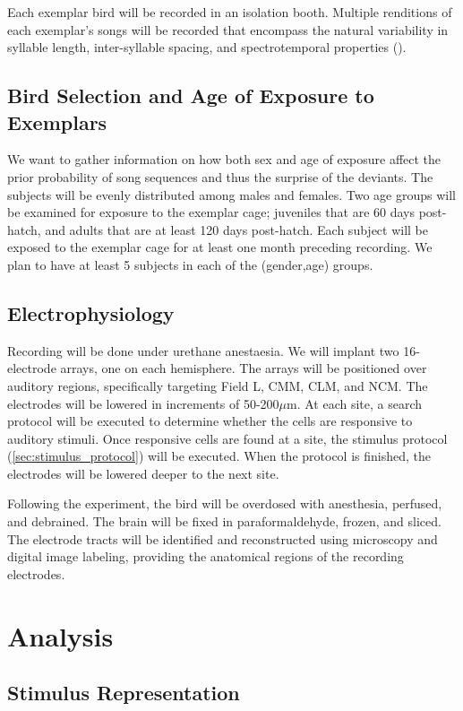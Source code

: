 \documentclass[12pt,article,oneside]{memoir}
\begin{document}
Each exemplar bird will be recorded in an isolation booth. Multiple renditions of each
exemplar's songs will be recorded that encompass the natural variability in syllable
length, inter-syllable spacing, and spectrotemporal properties (\cite{Glaze2006}).

\subsection{Bird Selection and Age of Exposure to Exemplars}

We want to gather information on how both sex and age of exposure affect the prior probability of
song sequences and thus the surprise of the deviants. The subjects will be evenly distributed
among males and females. Two age groups will be examined for exposure to the exemplar cage;
juveniles that are 60 days post-hatch, and adults that are at least 120 days post-hatch. Each
subject will be exposed to the exemplar cage for at least one month preceding recording. We plan
to have at least 5 subjects in each of the (gender,age) groups.

\subsection{Electrophysiology}

Recording will be done under urethane anestaesia. We will implant two 16-electrode arrays, one on
each hemisphere. The arrays will be positioned over auditory regions, specifically targeting
Field L, CMM, CLM, and NCM. The electrodes will be lowered in increments of 50-200$\mu$m. At each
site, a search protocol will be executed to determine whether the cells are responsive to auditory
stimuli. Once responsive cells are found at a site, the stimulus protocol (\ref{sec:stimulus_protocol})
will be executed. When the protocol is finished, the electrodes will be lowered deeper to the next site.

Following the experiment, the bird will be overdosed with anesthesia, perfused, and debrained. The
brain will be fixed in paraformaldehyde, frozen, and sliced. The electrode tracts will be identified
and reconstructed using microscopy and digital image labeling, providing the anatomical regions of
the recording electrodes.

\section{Analysis}


\subsection{Stimulus Representation}
\end{document}
